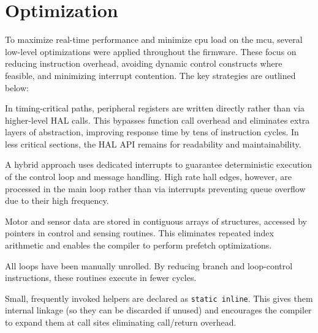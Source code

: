 \section{Optimization}

To maximize real-time performance and minimize \gls{cpu} load on the \gls{mcu}, several low-level optimizations were applied throughout the firmware. These focus on reducing instruction overhead, avoiding dynamic control constructs where feasible, and minimizing interrupt contention. The key strategies are outlined below:

\begin{description}[font=\normalfont\bfseries,leftmargin=!,labelwidth=\widthof{\bfseries Loop Unrolling}]
  \item[Direct register access vs.\ HAL]
        In timing-critical paths, peripheral registers are written directly rather than via higher-level HAL calls. This bypasses function call overhead and eliminates extra layers of abstraction, improving response time by tens of instruction cycles. In less critical sections, the HAL API remains for readability and maintainability.

  \item[Interrupt driven processing]   A hybrid approach uses dedicated interrupts to guarantee deterministic execution of the control loop and message handling. High rate \gls{hall} edges, however, are processed in the main loop rather than via interrupts preventing queue overflow due to their high frequency.

  \item[Pointer utilization for data structures]
        Motor and sensor data are stored in contiguous arrays of structures, accessed by pointers in control and sensing routines. This eliminates repeated index arithmetic and enables the compiler to perform prefetch optimizations.

  \item[Loop unrolling]
        All loops have been manually unrolled. By reducing branch and loop-control instructions, these routines execute in fewer cycles.

  \item[Use of \texttt{inline} and \texttt{static} Functions]
        Small, frequently invoked helpers are declared as \texttt{static inline}. This gives them internal linkage (so they can be discarded if unused) and encourages the compiler to expand them at call sites eliminating call/return overhead.
\end{description}

